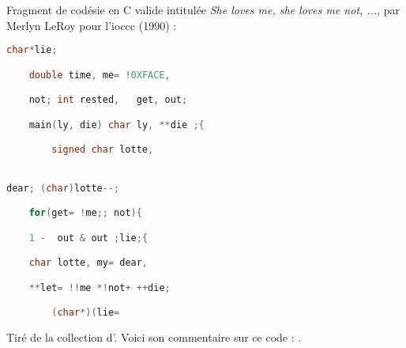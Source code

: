 \documentclass[12pt]{article} %
\begin{document}
Fragment de codésie en C valide intitulée \textit{She loves me, she loves me not, ...}, par  Merlyn LeRoy pour l'\acrshort{ioccc} (1990) :
\begin{lstlisting}[language=C, caption={}, label={codework:}]
    char*lie;

	double time, me= !0XFACE,

	not; int rested,   get, out;

	main(ly, die) char ly, **die ;{

	    signed char lotte,


dear; (char)lotte--;

	for(get= !me;; not){

	1 -  out & out ;lie;{

	char lotte, my= dear,

	**let= !!me *!not+ ++die;

	    (char*)(lie=
\end{lstlisting}
Tiré de la collection d'\citeauthor{MEnriqueBermudez-ObfuscatedCCode}. Voici son commentaire sur ce code :  \cite{MEnriqueBermudez-ObfuscatedCCode}.




\newpage
\printglossary[type=\acronymtype, title=Acronymes]

\printglossary[title=Glossaire]

\newpage
\printbibliography[
    heading=bibintoc,
    category=cited,
    title={Références}
]

\printbibliography[
    notcategory=cited,
    heading=bibintoc,
    title={Bibliographie complémentaire},
]


\restoregeometry
\end{document}
